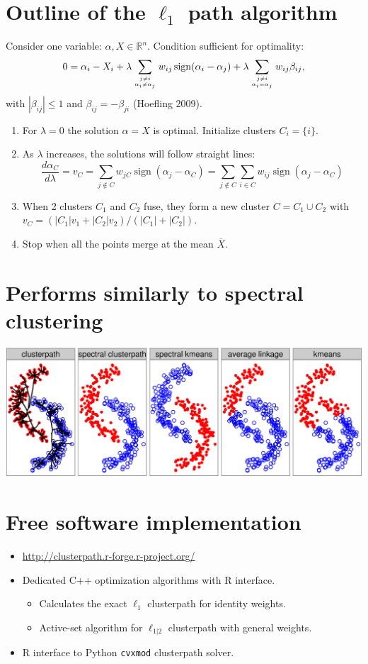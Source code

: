 \documentclass[]{posterDIGITEO}
\newcommand{\RR}{\mathbb R}
\begin{document}
\begin{multicols}{2}
\section{Outline of the $\ell_1$ path algorithm}
Consider one variable: $\alpha,X\in\RR^n$. Condition sufficient for optimality:
$$0 = \alpha_{i} - X_{i} + 
\lambda \sum_{j\neq i\atop \alpha_i \neq \alpha_j}w_{ij}
\operatorname{sign}({\alpha_i-\alpha_j}) + 
\lambda \sum_{j\neq i \atop \alpha_i = \alpha_j}w_{ij} \beta_{ij},$$
with $|\beta_{ij}|\leq 1$ and $\beta_{ij}=-\beta_{ji}$ (Hoefling 2009).
\begin{enumerate}
\item For $\lambda=0$ the solution $\alpha=X$ is optimal. Initialize
  clusters $C_i = \{i\}$. 
\item As $\lambda$ increases, the solutions will follow straight
  lines:
$$\frac {d\alpha_C}{d\lambda}=v_C = 
\sum_{j\not\in C}w_{jC}\operatorname{sign}(\alpha_j-\alpha_C)=
\sum_{j\not\in C}\sum_{i\in C} w_{ij}\operatorname{sign}(\alpha_j-\alpha_C)$$
\item When 2 clusters $C_1$ and $C_2$ fuse, they form a
  new cluster $C = C_1\cup C_2$ with $v_C = (
|C_1|v_1 + |C_2|v_2
)/(
|C_1|+|C_2|
)$.
\item Stop when all the points merge at the mean $\overline X$.
\end{enumerate}

\section{Performs similarly to spectral clustering}
\includegraphics[width=\columnwidth]{moons}


\section{Free software implementation}
\begin{itemize}
\item \url{http://clusterpath.r-forge.r-project.org/}
\item Dedicated C++ optimization algorithms with R interface.
  \begin{itemize} 
  \item Calculates the exact $\ell_1$ clusterpath for identity weights.
  \item Active-set algorithm for $\ell_{1|2}$ clusterpath with general
    weights.
  \end{itemize}
\item R interface to Python \texttt{cvxmod} clusterpath solver.
\end{itemize}


\end{multicols}
\end{document}
